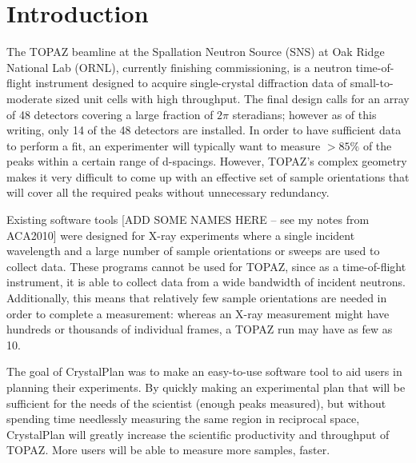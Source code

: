\documentclass{iucr}              %
\begin{document}
\section{Introduction}

The TOPAZ beamline at the Spallation Neutron Source (SNS) at Oak Ridge National
Lab (ORNL), currently finishing commissioning, is a neutron time-of-flight
instrument designed to acquire single-crystal diffraction data of
small-to-moderate sized unit cells with high throughput. The final design calls
for an array of 48 detectors covering a large fraction of  $2\pi$ steradians;
however as of this writing, only 14 of the 48 detectors are installed. In order
to have sufficient data to perform a fit, an experimenter will  typically want
to measure $ > 85\%$ of the peaks within a certain range of d-spacings. 
However, TOPAZ's complex geometry makes it very difficult to come up with an
effective set of sample orientations that will cover all the required peaks
without unnecessary redundancy. 


Existing software tools [ADD SOME NAMES HERE – see my notes from ACA2010] 
were designed for X-ray experiments where a single incident
wavelength and a large number of sample orientations or sweeps are used to
collect data. These programs cannot be used for TOPAZ, 
since as a time-of-flight instrument, it is able to collect data
from a wide bandwidth of incident neutrons. 
Additionally, this means that relatively few sample orientations are needed in
order to complete a measurement: whereas an X-ray measurement might have
hundreds or thousands of individual frames, a TOPAZ run may have as few as 10.   


The goal of CrystalPlan was to make an easy-to-use software tool to aid users in
planning their experiments. By quickly making an experimental plan that will be
sufficient for the needs of the scientist (enough peaks measured), but without
spending time needlessly measuring the same region in reciprocal space,
CrystalPlan will greatly increase the scientific productivity and throughput of
TOPAZ. More users will be able to measure more samples, faster. 

\end{document}
